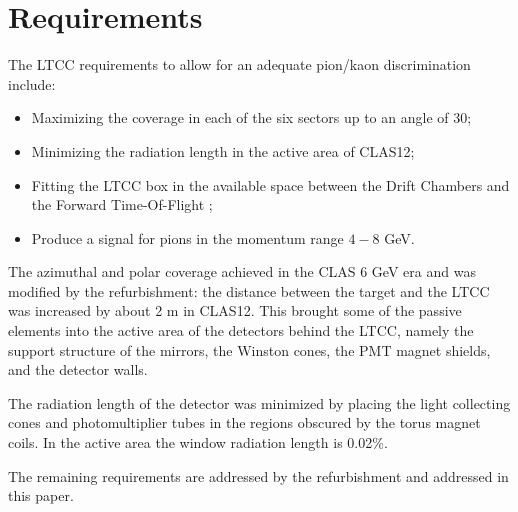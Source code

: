\section{Requirements}


The LTCC requirements to allow for an adequate pion/kaon discrimination include:


\begin{itemize}
	\item Maximizing the coverage in each of the six sectors up to an angle of 30\mdeg;
	\item Minimizing the radiation length in the active area of CLAS12;
	\item Fitting the LTCC box in the available space between the Drift Chambers \cite{dc-nim} and the Forward Time-Of-Flight \cite{ftof-nim};
	\item Produce a signal for pions in the momentum range $4-8$ GeV.
\end{itemize}

The azimuthal and polar coverage achieved in the CLAS 6 GeV era and was modified by the refurbishment:
the distance between the target and the LTCC was increased by about 2 m in CLAS12. This brought some of the passive
elements into the active area of the detectors behind the LTCC, namely the support structure of the mirrors, the Winston
cones, the PMT magnet shields, and the detector walls.

The radiation length of the detector was minimized by placing the light collecting cones and photomultiplier tubes
in the regions obscured by the torus magnet coils. In the active area the window radiation length is 0.02$\%$.

The remaining requirements are addressed by the refurbishment and addressed in this paper.

